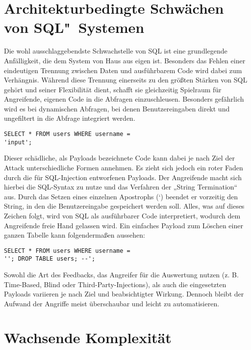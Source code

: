 \documentclass[a4paper,10pt,parskip,twocolumn]{article}
\begin{document}
\section{Architekturbedingte Schwächen von SQL"~Systemen}

    Die wohl ausschlaggebendste Schwachstelle von SQL ist eine grundlegende Anfälligkeit, die dem System von Haus aus eigen ist. Besonders das Fehlen einer eindeutigen Trennung zwischen Daten und ausführbarem Code wird dabei zum Verhängnis. Während diese Trennung einerseits zu den größten Stärken von SQL gehört und seiner Flexibilität dient, schafft sie gleichzeitig Spielraum für Angreifende, eigenen Code in die Abfragen einzuschleusen. Besonders gefährlich wird es bei dynamischen Abfragen, bei denen Benutzereingaben direkt und ungefiltert in die Abfrage integriert werden.

\begin{lstlisting}[style=sqlStyle]
SELECT * FROM users WHERE username =
'input';
\end{lstlisting}

    Dieser schädliche, als Payloads bezeichnete Code kann dabei je nach Ziel der Attack unterschiedliche Formen annehmen. Es zieht sich jedoch ein roter Faden durch die für SQL-Injection entworfenen Payloads. Der Angreifende macht sich hierbei die SQL-Syntax zu nutze und das Verfahren der „String Termination“ aus. Durch das Setzen eines einzelnen Apostrophs (‘) beendet er vorzeitig den String, in den die Benutzereingabe gespeichert werden soll. Alles, was auf dieses Zeichen folgt, wird von SQL als ausführbarer Code interpretiert, wodurch dem Angreifende freie Hand gelassen wird.
    Ein einfaches Payload zum Löschen einer ganzen Tabelle kann folgendermaßen aussehen:

\begin{lstlisting}[style=sqlStyle]
SELECT * FROM users WHERE username =
''; DROP TABLE users; --';
\end{lstlisting}

    Sowohl die Art des Feedbacks, das Angreifer für die Auswertung nutzen (z. B. Time-Based, Blind oder Third-Party-Injections), als auch die eingesetzten Payloads variieren je nach Ziel und beabsichtigter Wirkung\cite{7012815}. Dennoch bleibt der Aufwand der Angriffe meist überschaubar und leicht zu automatisieren.

\section{Wachsende Komplexität}
\end{document}
